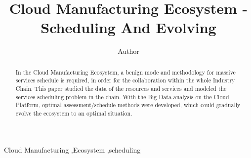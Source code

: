 
\title{Cloud Manufacturing Ecosystem - Scheduling And Evolving}

\author[label1]{Author}
\address[label1]{ZJU}
\begin{abstract}
In the Cloud Manufacturing Ecosystem, a benign mode and methodology for massive services schedule is
required, in order for the collaboration within the whole Industry Chain. This paper studied the data of the
resources and services and modeled the services scheduling problem in the chain. With the Big Data
analysis on the Cloud Platform, optimal assessment/schedule methods were developed, which could
gradually evolve the ecosystem to an optimal situation. 
\end{abstract}

\begin{keyword}
Cloud Manufacturing \sep Ecosystem \sep scheduling
\end{keyword}